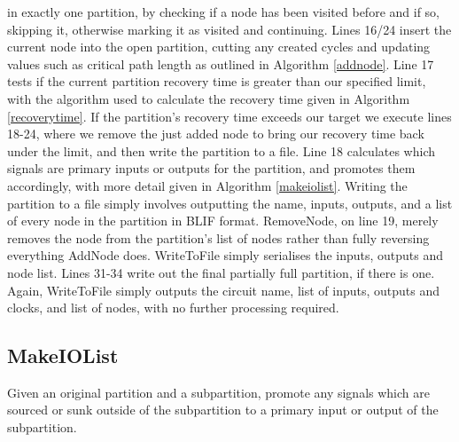 \documentclass[12pt,final,oneside]{dwThesis} %
\begin{document}
   in exactly one partition, by checking if a node has been visited before and
   if so, skipping it, otherwise marking it as visited and continuing.  Lines
   16/24 insert the current node into the open partition, cutting any created
   cycles and updating values such as critical path length as outlined in
   Algorithm \ref{addnode}.  Line 17 tests if the current partition recovery
   time is greater than our specified limit, with the algorithm used to
   calculate the recovery time given in Algorithm \ref{recoverytime}.  If the
   partition's recovery time exceeds our target we execute lines 18-24, where
   we remove the just added node to bring our recovery time back under the
   limit, and then write the partition to a file.  Line 18 calculates which
   signals are primary inputs or outputs for the partition, and promotes them
   accordingly, with more detail given in Algorithm \ref{makeiolist}.  Writing
   the partition to a file simply involves outputting the name, inputs,
   outputs, and a list of every node in the partition in \gls{BLIF} format.
   RemoveNode, on line 19, merely removes the node from the partition's list of
   nodes rather than fully reversing everything AddNode does. WriteToFile
   simply serialises the inputs, outputs and node list.  Lines 31-34 write out
   the final partially full partition, if there is one. Again, WriteToFile
   simply outputs the circuit name, list of inputs, outputs and clocks, and
   list of nodes, with no further processing required.


   \newpage 
   \subsection{MakeIOList}
   Given an original partition and a
   subpartition, promote any signals which are sourced or sunk outside of the
   subpartition to a primary input or output of the subpartition.
\end{document}
